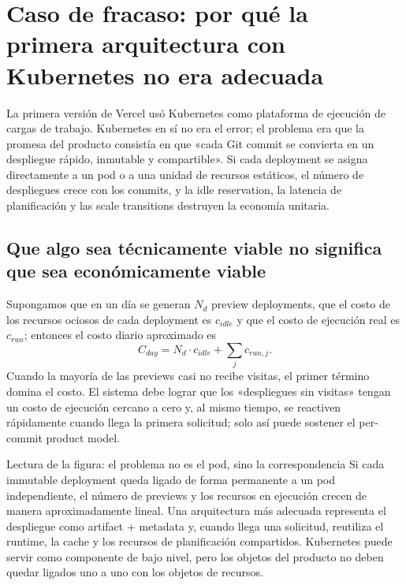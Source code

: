 \section{Caso de fracaso: por qué la primera arquitectura con Kubernetes no era adecuada}

La primera versión de Vercel usó Kubernetes como plataforma de ejecución de cargas de trabajo. Kubernetes en sí no era el error; el problema era que la promesa del producto consistía en que «cada Git commit se convierta en un despliegue rápido, inmutable y compartible». Si cada deployment se asigna directamente a un pod o a una unidad de recursos estáticos, el número de despliegues crece con los commits, y la idle reservation, la latencia de planificación y las scale transitions destruyen la economía unitaria.

\subsection{Que algo sea técnicamente viable no significa que sea económicamente viable}

Supongamos que en un día se generan $N_d$ preview deployments, que el costo de los recursos ociosos de cada deployment es $c_{idle}$ y que el costo de ejecución real es $c_{run}$; entonces el costo diario aproximado es
\[
C_{day}=N_d\cdot c_{idle}+\sum_j c_{run,j}.
\]
Cuando la mayoría de las previews casi no recibe visitas, el primer término domina el costo. El sistema debe lograr que los «despliegues sin visitas» tengan un costo de ejecución cercano a cero y, al mismo tiempo, se reactiven rápidamente cuando llega la primera solicitud; solo así puede sostener el per-commit product model.


\begin{knowledgebox}{Lectura de la figura: el problema no es el pod, sino la correspondencia}
Si cada immutable deployment queda ligado de forma permanente a un pod independiente, el número de previews y los recursos en ejecución crecen de manera aproximadamente lineal. Una arquitectura más adecuada representa el despliegue como artifact + metadata y, cuando llega una solicitud, reutiliza el runtime, la cache y los recursos de planificación compartidos. Kubernetes puede servir como componente de bajo nivel, pero los objetos del producto no deben quedar ligados uno a uno con los objetos de recursos.
\end{knowledgebox}

